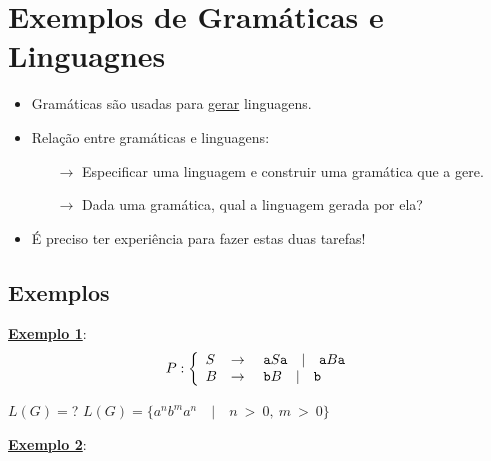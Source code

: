 \section{Exemplos de Gramáticas e Linguagnes}

\begin{itemize}
  \item Gramáticas são usadas para \underline{gerar} linguagens.
  \item Relação entre gramáticas e linguagens:
   \begin{itemize}
     \item[$\rightarrow$] Especificar uma linguagem e construir uma gramática que a gere.
     \item[$\rightarrow$] Dada uma gramática, qual a linguagem gerada por ela?
   \end{itemize}
  \item É preciso ter experiência para fazer estas duas tarefas!
\end{itemize}

\subsection{Exemplos}

\textbf{\underline{Exemplo 1}}:\\
   \[
      P:\left\{
      \begin{array}{l c l}
        S & \rightarrow & \ \texttt{a}S\texttt{a} \quad | \quad \texttt{a}B\texttt{a} \\
	B & \rightarrow & \ \texttt{b}B  \quad | \quad \texttt{b}  \\
      \end{array}
      \right.
  \]
\begin{center}
  {\color{red} $ L(G) = ${\Huge ?} }
  \makebox[\linewidth]{\rule{\paperwidth/2}{0.4pt}}
  \vspace{1cm}
  {\color{blue} $ L(G) = \{ a^{n}b^{m}a^{n} \quad | \quad n \ > \ 0, \ m \ > \ 0 \}$ }
\end{center}

\textbf{\underline{Exemplo 2}}:\\

